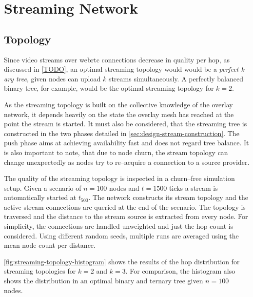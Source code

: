 \section{Streaming Network}

\subsection{Topology}

Since video streams over \gls{webrtc} connections decrease in quality per hop, as discussed in \vref{TODO}, an optimal streaming topology would would be a \textit{perfect k–ary tree}, given nodes can upload $k$ streams simultaneously. A perfectly balanced binary tree, for example, would be the optimal streaming topology for $k=2$.

As the streaming topology is built on the collective knowledge of the overlay network, it depends heavily on the state the overlay mesh has reached at the point the stream is started. It must also be considered, that the streaming tree is constructed in the two phases detailed in \vref{sec:design-stream-construction}. The push phase aims at achieving availability fast and does not regard tree balance.
It is also important to note, that due to node churn, the stream topology can change unexpectedly as nodes try to re–acquire a connection to a source provider.

The quality of the streaming topology is inspected in a churn–free simulation setup. Given a scenario of $n=100$ nodes and $t=1500$ ticks a stream is automatically started at $t_{500}$. The network constructs its stream topology and the active stream connections are queried at the end of the scenario. The topology is traversed and the distance to the stream source is extracted from every node. For simplicity, the connections are handled unweighted and just the hop count is considered.
Using different random seeds, multiple runs are averaged using the mean node count per distance.

\vref{fig:streaming-topology-histogram} shows the results of the hop distribution for streaming topologies for $k=2$ and $k=3$. For comparison, the histogram also shows the distribution in an optimal binary and ternary tree given $n=100$ nodes.

